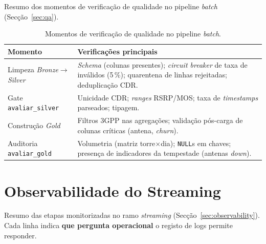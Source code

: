 \documentclass[runningheads]{llncs}
\begin{document}
Resumo dos momentos de verificação de qualidade no pipeline \textit{batch} (Secção~\ref{sec:qa}).

\begin{table}[ht]
\centering
\caption{Momentos de verificação de qualidade no pipeline \textit{batch}.}
\label{tab:qa-checks}
\small
\renewcommand{\arraystretch}{1.12}
\begin{tabularx}{\textwidth}{@{}l X@{}}
\toprule
\textbf{Momento} & \textbf{Verificações principais} \\
\midrule
Limpeza \textit{Bronze}$\rightarrow$\textit{Silver} &
\textit{Schema} (colunas presentes); \textit{circuit breaker} de taxa de inválidos (5\,\%); quarentena de linhas rejeitadas; deduplicação CDR. \\
\addlinespace
Gate \texttt{avaliar\_silver} &
Unicidade CDR; \textit{ranges} RSRP/MOS; taxa de \textit{timestamps} parseados; tipagem. \\
\addlinespace
Construção \textit{Gold} &
Filtros 3GPP nas agregações; validação pós-carga de colunas críticas (antena, \textit{churn}). \\
\addlinespace
Auditoria \texttt{avaliar\_gold} &
Volumetria (matriz torre$\times$dia); \texttt{NULL}s em chaves; presença de indicadores da tempestade (antenas \textit{down}). \\
\bottomrule
\end{tabularx}
\end{table}

\clearpage

\section{Observabilidade do Streaming}
\label{anexo:obs_streaming}

Resumo das etapas monitorizadas no ramo \textit{streaming} (Secção~\ref{sec:observability}). Cada linha indica \textbf{que pergunta operacional} o registo de logs permite responder.
\end{document}
